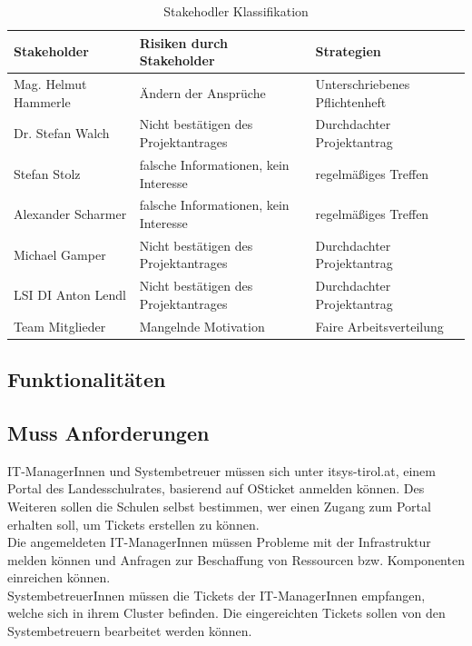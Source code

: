 \begin{table}[h]
	\centering
	\begin{tabular}{|lll|}
		\hline
		Stakeholder          & Risiken durch Stakeholder                        & Strategien                                            \\ \hline
		Mag. Helmut Hammerle & Ändern der Ansprüche          & Unterschriebenes Pflichtenheft  \\
		Dr. Stefan Walch      & Nicht bestätigen des Projektantrages             & Durchdachter Projektantrag                            \\
		Stefan Stolz         & falsche Informationen, kein Interesse & regelmäßiges Treffen             \\
		Alexander Scharmer   & falsche Informationen, kein Interesse & regelmäßiges Treffen              \\
		Michael Gamper       & Nicht bestätigen des Projektantrages             & Durchdachter Projektantrag                            \\
		LSI DI Anton Lendl   & Nicht bestätigen des Projektantrages             & Durchdachter Projektantrag                            \\
		Team Mitglieder      & Mangelnde Motivation                             & Faire Arbeitsverteilung           \\ \hline			
	\end{tabular}
	\caption{Stakehodler Klassifikation}
	\label{Tbl_Stakeholder_Klassifikation}
\end{table}


\subsection{Funktionalitäten}
\subsection{Muss Anforderungen}
IT-ManagerInnen und Systembetreuer müssen sich unter itsys-tirol.at, einem Portal des Landesschulrates, basierend auf OSticket anmelden können. Des Weiteren sollen die Schulen selbst bestimmen, wer einen Zugang zum Portal erhalten soll, um Tickets erstellen zu können.
\\
Die angemeldeten IT-ManagerInnen müssen Probleme mit der Infrastruktur melden können und Anfragen zur Beschaffung von Ressourcen bzw. Komponenten einreichen können.
\\
SystembetreuerInnen müssen die Tickets der IT-ManagerInnen empfangen, welche sich in ihrem Cluster befinden. Die eingereichten Tickets sollen von den Systembetreuern bearbeitet werden können.

